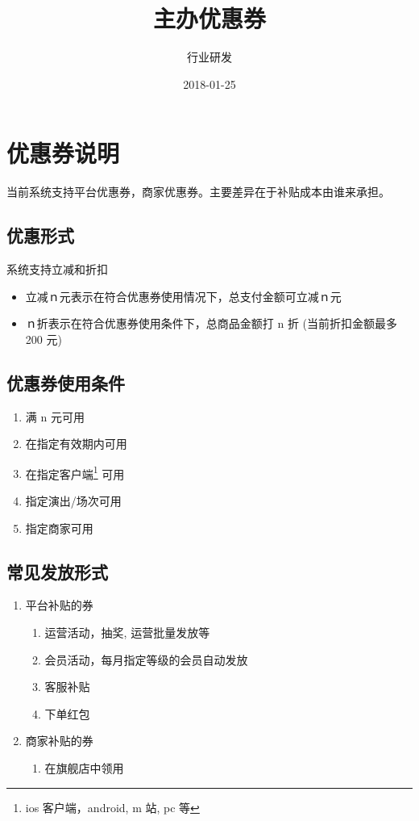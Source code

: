 \documentclass[11pt,a4paper]{article}
\author{行业研发}
\date{2018-01-25}
\title{主办优惠券}
\begin{document}
\maketitle
\tableofcontents


\section{优惠券说明}
\label{sec:org324e77d}

当前系统支持平台优惠券，商家优惠券。主要差异在于补贴成本由谁来承担。

\subsection{优惠形式}
\label{sec:org8c1ad2c}
系统支持立减和折扣
\begin{itemize}
\item 立减ｎ元表示在符合优惠券使用情况下，总支付金额可立减ｎ元
\item ｎ折表示在符合优惠券使用条件下，总商品金额打 n 折 (当前折扣金额最多 200 元)
\end{itemize}

\subsection{优惠券使用条件}
\label{sec:org6bd610c}
\begin{enumerate}
\item 满 n 元可用
\item 在指定有效期内可用
\item 在指定客户端\footnote{ios 客户端，android, m 站, pc 等} 可用
\item 指定演出/场次可用
\item 指定商家可用
\end{enumerate}

\subsection{常见发放形式}
\label{sec:org6280de3}
\begin{enumerate}
\item 平台补贴的券
\label{sec:orga684553}
\begin{enumerate}
\item 运营活动，抽奖, 运营批量发放等
\item 会员活动，每月指定等级的会员自动发放
\item 客服补贴
\item 下单红包
\end{enumerate}

\item 商家补贴的券
\label{sec:org792f119}
\begin{enumerate}
\item 在旗舰店中领用
\end{enumerate}
\end{enumerate}
\end{document}
